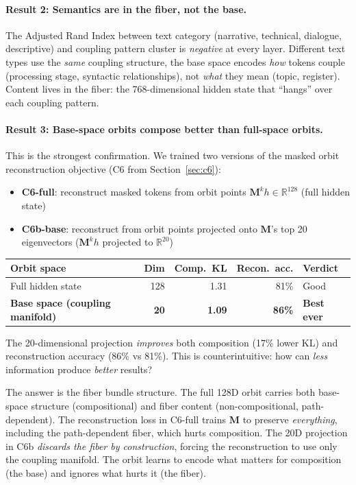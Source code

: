 \documentclass[11pt, a4paper]{article}
\newcommand{\M}{\mathbf{M}}
\newcommand{\R}{\mathbb{R}}
\theoremstyle{remark}
\begin{document}
\paragraph{Result 2: Semantics are in the fiber, not the base.}
The Adjusted Rand Index between text category (narrative, technical, dialogue, descriptive) and coupling pattern cluster is \emph{negative} at every layer.
Different text types use the \emph{same} coupling structure, the base space encodes \emph{how} tokens couple (processing stage, syntactic relationships), not \emph{what} they mean (topic, register).
Content lives in the fiber: the 768-dimensional hidden state that ``hangs'' over each coupling pattern.

\paragraph{Result 3: Base-space orbits compose better than full-space orbits.}
This is the strongest confirmation.
We trained two versions of the masked orbit reconstruction objective (C6 from Section~\ref{sec:c6}):
\begin{itemize}[nosep]
    \item \textbf{C6-full}: reconstruct masked tokens from orbit points $\M^k h \in \R^{128}$ (full hidden state)
    \item \textbf{C6b-base}: reconstruct from orbit points projected onto $\M$'s top 20 eigenvectors ($\M^k h$ projected to $\R^{20}$)
\end{itemize}

\begin{center}\small
\begin{tabular}{@{}lrrrl@{}}
\toprule
\textbf{Orbit space} & \textbf{Dim} & \textbf{Comp.\ KL} & \textbf{Recon.\ acc.} & \textbf{Verdict} \\
\midrule
Full hidden state & 128 & 1.31 & 81\% & Good \\
\textbf{Base space (coupling manifold)} & \textbf{20} & \textbf{1.09} & \textbf{86\%} & \textbf{Best ever} \\
\bottomrule
\end{tabular}
\end{center}

The 20-dimensional projection \emph{improves} both composition (17\% lower KL) and reconstruction accuracy (86\% vs 81\%).
This is counterintuitive: how can \emph{less} information produce \emph{better} results?

The answer is the fiber bundle structure.
The full 128D orbit carries both base-space structure (compositional) and fiber content (non-compositional, path-dependent).
The reconstruction loss in C6-full trains $\M$ to preserve \emph{everything}, including the path-dependent fiber, which hurts composition.
The 20D projection in C6b \emph{discards the fiber by construction}, forcing the reconstruction to use only the coupling manifold.
The orbit learns to encode what matters for composition (the base) and ignores what hurts it (the fiber).
\end{document}
